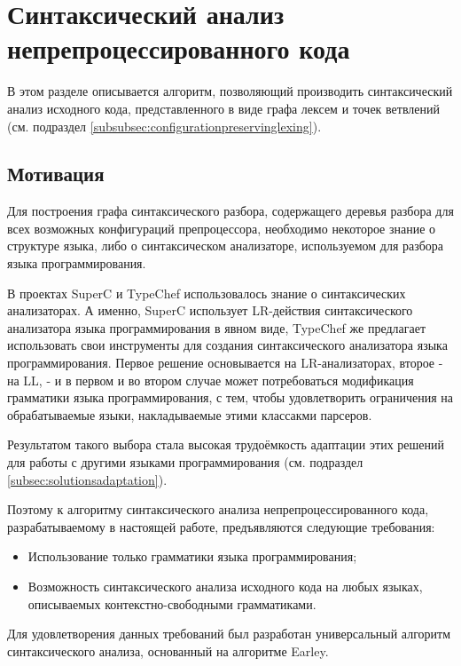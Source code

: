\clearpage

\section{Синтаксический анализ непрепроцессированного кода}

В этом разделе описывается алгоритм, позволяющий производить синтаксический анализ исходного кода, представленного в виде графа лексем и точек ветвлений (см. подраздел \ref{subsubsec:configurationpreservinglexing}).

\subsection{Мотивация}

Для построения графа синтаксического разбора, содержащего деревья разбора для всех возможных конфигураций препроцессора, необходимо некоторое знание о структуре языка, либо о синтаксическом анализаторе, используемом для разбора языка программирования.

В проектах SuperC и TypeChef использовалось знание о синтаксических анализаторах. А именно, SuperC использует LR-действия синтаксического анализатора языка программирования в явном виде, TypeChef же предлагает использовать свои инструменты для создания синтаксического анализатора языка программирования. Первое решение основывается на LR-анализаторах, второе - на LL, - и в первом и во втором случае может потребоваться модификация грамматики языка программирования, с тем, чтобы удовлетворить ограничения на обрабатываемые языки, накладываемые этими классакми парсеров.

Результатом такого выбора стала высокая трудоёмкость адаптации этих решений для работы с другими языками программирования (см. подраздел \ref{subsec:solutionsadaptation}).

Поэтому к алгоритму синтаксического анализа непрепроцессированного кода, разрабатываемому в настоящей работе, предъявляются следующие требования:

\begin{itemize}
\item Использование только грамматики языка программирования;
\item Возможность синтаксического анализа исходного кода на любых языках, описываемых контекстно-свободными грамматиками\cite{cfg}.
\end{itemize}

Для удовлетворения данных требований был разработан универсальный алгоритм синтаксического анализа, основанный на алгоритме Earley\cite{earley68}.

